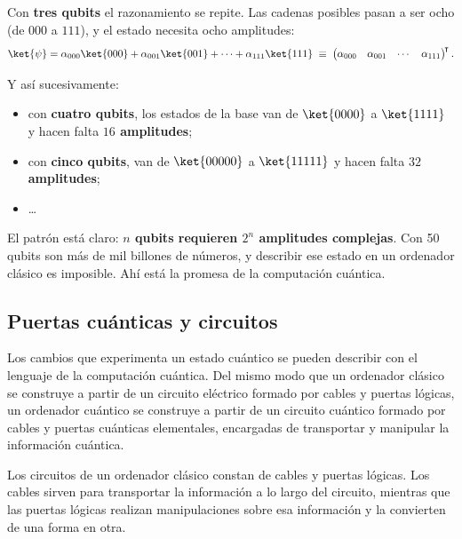 Con \textbf{tres qubits} el razonamiento se repite. Las cadenas posibles pasan a ser ocho
(de $000$ a $111$), y el estado necesita ocho amplitudes:
\begin{equation}
\label{eq:tres_qubits}
\ket{\psi} = \alpha_{000}\ket{000} + \alpha_{001}\ket{001} + \cdots + \alpha_{111}\ket{111}
\;\equiv\;
\begin{pmatrix} \alpha_{000} & \alpha_{001} & \cdots & \alpha_{111}\end{pmatrix}^{\!\intercal}.
\end{equation}

Y así sucesivamente:
\begin{itemize}
    \item con \textbf{cuatro qubits}, los estados de la base van de $\ket{0000}$ a
          $\ket{1111}$ y hacen falta \textbf{$16$ amplitudes};
    \item con \textbf{cinco qubits}, van de $\ket{00000}$ a $\ket{11111}$ y hacen falta
          \textbf{$32$ amplitudes};
    \item \dots
\end{itemize}

El patrón está claro: \textbf{$n$ qubits requieren $2^n$ amplitudes complejas}. Con 50
qubits son más de mil billones de números, y describir ese estado en un ordenador clásico
es imposible. Ahí está la promesa de la computación cuántica.

\subsection{Puertas cuánticas y circuitos}
\label{sec:puertas}
%
Los cambios que experimenta un estado cuántico se pueden describir con el lenguaje de la
computación cuántica. Del mismo modo que un ordenador clásico se construye a partir de un
circuito eléctrico formado por cables y puertas lógicas, un ordenador cuántico se construye
a partir de un circuito cuántico formado por cables y puertas cuánticas elementales,
encargadas de transportar y manipular la información cuántica.

Los circuitos de un ordenador clásico constan de cables y puertas lógicas. Los cables
sirven para transportar la información a lo largo del circuito, mientras que las puertas
lógicas realizan manipulaciones sobre esa información y la convierten de una forma en otra.

